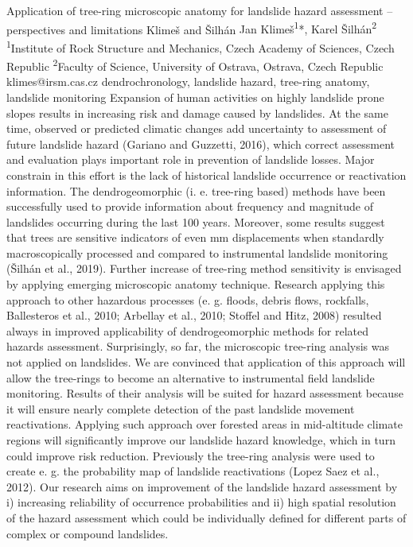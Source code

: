 \abstract
{Application of tree-ring microscopic anatomy for landslide hazard assessment – perspectives and limitations} 
{Klimeš and Šilhán} 
{Jan Klimeš\textsuperscript{1}*, Karel Šilhán\textsuperscript{2}} 
{\POtag} 
{
\textsuperscript{1}Institute of Rock Structure and Mechanics, Czech Academy of Sciences, Czech Republic
\textsuperscript{2}Faculty of Science, University of Ostrava, Ostrava, Czech Republic
}
{klimes@irsm.cas.cz}  %
{dendrochronology, landslide hazard, tree-ring anatomy, landslide monitoring}
{Expansion of human activities on highly landslide prone slopes results in increasing risk and damage caused by landslides. At the same time, observed or predicted climatic changes add uncertainty to assessment of future landslide hazard (Gariano and Guzzetti, 2016), which correct assessment and evaluation plays important role in prevention of landslide losses. Major constrain in this effort is the lack of historical landslide occurrence or reactivation information. The dendrogeomorphic (i. e. tree-ring based) methods have been successfully used to provide information about frequency and magnitude of landslides occurring during the last 100 years. Moreover, some results suggest that trees are sensitive indicators of even mm displacements when standardly macroscopically processed and compared to instrumental landslide monitoring (Šilhán et al., 2019). Further increase of tree-ring method sensitivity is envisaged by applying emerging microscopic anatomy technique. Research applying this approach to other hazardous processes (e. g. floods, debris flows, rockfalls, Ballesteros et al., 2010; Arbellay et al., 2010; Stoffel and Hitz, 2008) resulted always in improved applicability of dendrogeomorphic methods for related hazards assessment. Surprisingly, so far, the microscopic tree-ring analysis was not applied on landslides. We are convinced that application of this approach will allow the tree-rings to become an alternative to instrumental field landslide monitoring. Results of their analysis will be suited for hazard assessment because it will ensure nearly complete detection of the past landslide movement reactivations. Applying such approach over forested areas in mid-altitude climate regions will significantly improve our landslide hazard knowledge, which in turn could improve risk reduction. 
Previously the tree-ring analysis were used to create e. g. the probability map of landslide reactivations (Lopez Saez et al., 2012). Our research aims on improvement of the landslide hazard assessment by i) increasing reliability of occurrence probabilities and ii) high spatial resolution of the hazard assessment which could be individually defined for different parts of complex or compound landslides. 
}
